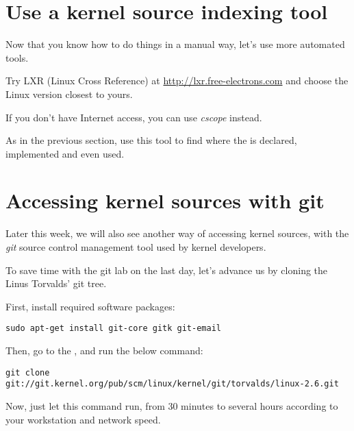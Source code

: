 \section{Use a kernel source indexing tool}

Now that you know how to do things in a manual way, let's use more
automated tools.

Try LXR (Linux Cross Reference) at \url{http://lxr.free-electrons.com}
and choose the Linux version closest to yours.

If you don't have Internet access, you can use {\em cscope} instead.

As in the previous section, use this tool to find where
the  is declared, implemented and
even used.

\section{Accessing kernel sources with git}

Later this week, we will also see another way of accessing kernel
sources, with the {\em git} source control management tool used by kernel
developers.

To save time with the git lab on the last day, let's advance us by
cloning the Linus Torvalds' git tree.

First, install required software packages:

\begin{verbatim}
sudo apt-get install git-core gitk git-email
\end{verbatim}

Then, go to the , and run
the below command:

\small
\begin{verbatim}
git clone git://git.kernel.org/pub/scm/linux/kernel/git/torvalds/linux-2.6.git
\end{verbatim}
\normalsize

Now, just let this command run, from 30 minutes to several hours
according to your workstation and network speed.

